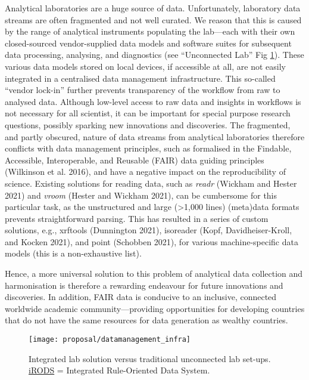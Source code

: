 \documentclass[]{article}
\begin{document}
Analytical laboratories are a huge source of data. Unfortunately, laboratory data streams are often fragmented and not well curated. We reason that this is caused by the range of analytical instruments populating the lab---each with their own closed-sourced vendor-supplied data models and software suites for subsequent data processing, analysing, and diagnostics (see ``Unconnected Lab'' Fig \ref{fig:intlab}). These various data models stored on local devices, if accessible at all, are not easily integrated in a centralised data management infrastructure. This so-called ``vendor lock-in'' further prevents transparency of the workflow from raw to analysed data. Although low-level access to raw data and insights in workflows is not necessary for all scientist, it can be important for special purpose research questions, possibly sparking new innovations and discoveries. The fragmented, and partly obscured, nature of data streams from analytical laboratories therefore conflicts with data management principles, such as formalised in the Findable, Accessible, Interoperable, and Reusable (FAIR) data guiding principles (Wilkinson et al. 2016), and have a negative impact on the reproducibility of science. Existing solutions for reading data, such as \emph{readr} (Wickham and Hester 2021) and \emph{vroom} (Hester and Wickham 2021), can be cumbersome for this particular task, as the unstructured and large (\textgreater{}1,000 lines) (meta)data formats prevents straightforward parsing. This has resulted in a series of custom solutions, e.g., xrftools (Dunnington 2021), isoreader (Kopf, Davidheiser-Kroll, and Kocken 2021), and point (Schobben 2021), for various machine-specific data models (this is a non-exhaustive list).

Hence, a more universal solution to this problem of analytical data collection and harmonisation is therefore a rewarding endeavour for future innovations and discoveries. In addition, FAIR data is conducive to an inclusive, connected worldwide academic community---providing opportunities for developing countries that do not have the same resources for data generation as wealthy countries.



\begin{figure}
\texttt{[image: proposal/datamanagement\_infra]} \caption{Integrated lab solution versus traditional unconnected lab set-ups. \href{https://irods.org/}{iRODS} = Integrated Rule-Oriented Data System.}\label{fig:intlab}
\end{figure}
\end{document}
